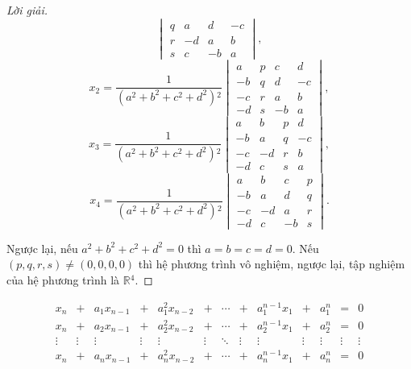 \documentclass[class=nhvh-linear-algebra,crop=false]{standalone}
\begin{document}
\begin{proof}[Lời giải]
\[\begin{vmatrix}
            q & a  & d  & -c \\
            r & -d & a  & b  \\
            s & c  & -b & a
        \end{vmatrix},
    \]
    \[
        x_{2} = \dfrac{1}{(a^{2} + b^{2} + c^{2} + d^{2}){}^{2}}
        \begin{vmatrix}
            a  & p & c  & d  \\
            -b & q & d  & -c \\
            -c & r & a  & b  \\
            -d & s & -b & a
        \end{vmatrix},
    \]
    \[
        x_{3} = \dfrac{1}{(a^{2} + b^{2} + c^{2} + d^{2}){}^{2}}
        \begin{vmatrix}
            a  & b  & p & d  \\
            -b & a  & q & -c \\
            -c & -d & r & b  \\
            -d & c  & s & a
        \end{vmatrix},
    \]
    \[
        x_{4} = \dfrac{1}{(a^{2} + b^{2} + c^{2} + d^{2}){}^{2}}
        \begin{vmatrix}
            a  & b  & c  & p \\
            -b & a  & d  & q \\
            -c & -d & a  & r \\
            -d & c  & -b & s
        \end{vmatrix}.
    \]
    \par Ngược lại, nếu $a^{2} + b^{2} + c^{2} + d^{2} = 0$ thì $a = b = c = d = 0$. Nếu $(p, q, r, s) \ne (0, 0, 0, 0)$ thì hệ phương trình vô nghiệm, ngược lại, tập nghiệm của hệ phương trình là $\mathbb{R}{}^{4}$.
\end{proof}

\begin{exercise}
    \[
        \begin{array}{ccccccccccccc}
            x_{n}  & +      & a_{1}x_{n-1} & +      & a_{1}^{2}x_{n-2} & +      & \cdots & +      & a_{1}^{n-1}x_{1} & +      & a_{1}^{n} & =      & 0      \\
            x_{n}  & +      & a_{2}x_{n-1} & +      & a_{2}^{2}x_{n-2} & +      & \cdots & +      & a_{2}^{n-1}x_{1} & +      & a_{2}^{n} & =      & 0      \\
            \vdots & \vdots & \vdots       & \vdots & \vdots           & \vdots & \ddots & \vdots & \vdots           & \vdots & \vdots    & \vdots & \vdots \\
            x_{n}  & +      & a_{n}x_{n-1} & +      & a_{n}^{2}x_{n-2} & +      & \cdots & +      & a_{n}^{n-1}x_{1} & +      & a_{n}^{n} & =      & 0      \\
        \end{array}
    \]
\end{exercise}
\end{document}
